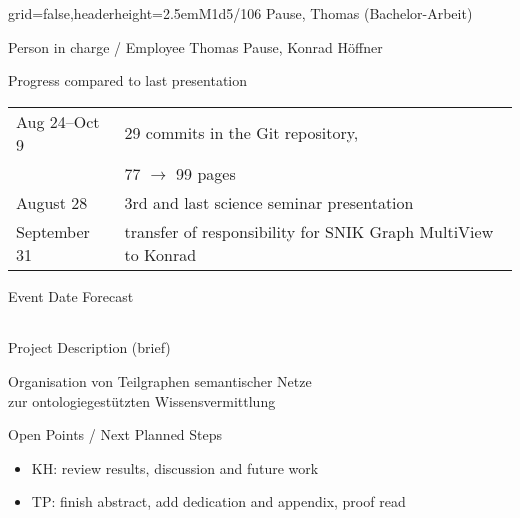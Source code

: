 \documentclass[english]{kiesgrube}
\begin{document}
\begin{poster}{grid=false,headerheight=2.5em}{}{M1d5/106 Pause, Thomas (Bachelor-Arbeit)}{}{}
\begin{posterbox}[name=person,column=0,row=0]{Person in charge / Employee}
Thomas Pause, Konrad Höffner
\end{posterbox}
\begin{posterbox}[name=progress,below=person]{Progress compared to last presentation}
\begin{tabulary}{\textwidth}{lL}
Aug 24--Oct 9	&29 commits in the Git repository,\\
				&77 $\rightarrow$ 99 pages\\
August 28	&3rd and last science seminar presentation\\
September 31	&transfer of responsibility for SNIK Graph MultiView to Konrad\\
\end{tabulary}
\end{posterbox}
\begin{posterbox}[name=event,below=progress]{Event Date Forecast}
\begin{tabulary}{\textwidth}{lL}
\end{tabulary}
\end{posterbox}
\begin{posterbox}[name=description,column=1,row=0]{Project Description (brief)}
\begin{center}
Organisation von Teilgraphen semantischer Netze\\
zur ontologiegestützten Wissensvermittlung
\end{center}
\end{posterbox}
\begin{posterbox}[name=open,column=1,below=description]{Open Points / Next Planned Steps}
\begin{itemize}
\item KH: review results, discussion and future work
\item TP: finish abstract, add dedication and appendix, proof read

\end{itemize}
\end{posterbox}
\end{poster}
\end{document}
